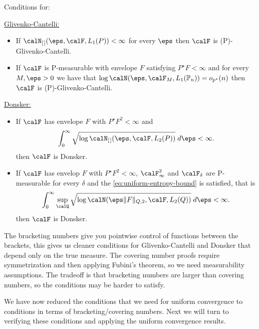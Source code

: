 \begin{remark*}
	Conditions for:

	\underline{Glivenko-Cantelli:}	
	\begin{itemize}
		\item If \(\calN_{[\hspace{0.1em}]}(\eps,\calF,L_1(P))<\infty\) for every \(\eps\) then \(\calF\) is (P)-Glivenko-Cantelli.
		\item If \(\calF\) is P-measurable with envelope \(F\) satisfying \(P^\star F <\infty\) and for every \(M,\eps > 0\) we have that \(\log\calN(\eps,\calF_M,L_1(\P_n)) = o_{p^\star}(n)\) then \(\calF\) is (P)-Glivenko-Cantelli.
	\end{itemize}
	\underline{Donsker:}
	\begin{itemize}
		\item If \(\calF\) has envelope \(F\) with \(P^\star F^2 <\infty\) and 
			\[
				\int_{0}^{\infty} \sqrt{\log\calN_{[\hspace{0.1em}]}(\eps,\calF,L_2(P))}\;d\eps <\infty  
			.\] 
			then \(\calF\) is Donsker. 
		\item If \(\calF\) has envelop \(F\) with \(P^\star F^2 <\infty\), \(\calF_\infty^2\) and \(\calF_\delta\) are P-measurable for every \(\delta\) and the \eqref{eq:uniform-entropy-bound} is satisfied, that is 
		\[
			\int_{0}^{\infty} \sup_\calQ \sqrt{\log\calN(\eps\|F\|_{Q,2},\calF,L_2(Q))}\;d\eps < \infty
		.\]
		then \(\calF\) is Donsker.
	\end{itemize}
	The bracketing numbers give you pointwise control of functions between the brackets, this gives us cleaner conditions for Glivenko-Cantelli and Donsker that depend only on the true measure. The covering number proofs require symmetrization and then applying Fubini's theorem, so we need measurability assumptions. The tradeoff is that bracketing numbers are larger than covering numbers, so the conditions may be harder to satisfy.
\end{remark*}

We have now reduced the conditions that we need for uniform convergence to conditions in terms of bracketing/covering numbers. Next we will turn to verifying these conditions and applying the uniform convergence results. 
